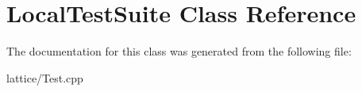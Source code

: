 \hypertarget{classLocalTestSuite}{
\section{LocalTestSuite Class Reference}
\label{classLocalTestSuite}
}


The documentation for this class was generated from the following file:\begin{DoxyCompactItemize}
\item 
lattice/Test.cpp\end{DoxyCompactItemize}
